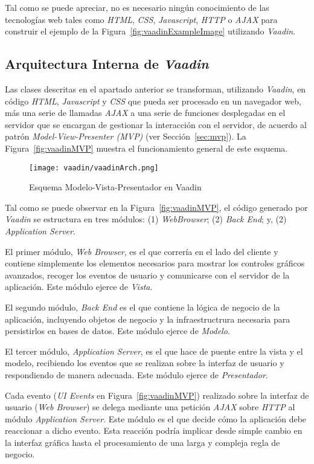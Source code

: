 Tal como se puede apreciar, no es necesario ningún conocimiento de las tecnologías web tales como \emph{HTML}, \emph{CSS}, \emph{Javascript}, \emph{HTTP} o \emph{AJAX} para construir el ejemplo de la Figura~\ref{fig:vaadinExampleImage} utilizando \emph{Vaadin}.

\subsection{Arquitectura Interna de \emph{Vaadin}}

Las clases descritas en el apartado anterior se transforman, utilizando \emph{Vaadin}, en código \emph{HTML}, \emph{Javascript} y \emph{CSS} que pueda ser procesado en un navegador web, más una serie de llamadas \emph{AJAX} a una serie de funciones desplegadas en el servidor que se encargan de gestionar la interacción con el servidor, de acuerdo al patrón \emph{Model-View-Presenter (MVP)} (ver Sección~\ref{sec:mvp}). La Figura~\ref{fig:vaadinMVP} muestra el funcionamiento general de este esquema.

\begin{figure}[!tb]
	\centering
	\texttt{[image: vaadin/vaadinArch.png]}
	\caption{Esquema Modelo-Vista-Presentador en Vaadin}
	\label{fig:fig:vaadinMVP}
\end{figure}

Tal como se puede observar en la Figura~\ref{fig:vaadinMVP}, el código generado por \emph{Vaadin} se estructura en tres módulos: (1) \emph{WebBrowser}; (2) \emph{Back End}; y, (2) \emph{Application Server}.

El primer módulo, \emph{Web Browser}, es el que correría en el lado del cliente y contiene simplemente los elementos necesarios para mostrar los controles gráficos avanzados, recoger los eventos de usuario y comunicarse con el servidor de la aplicación. Este módulo ejerce de \emph{Vista}.

El segundo módulo, \emph{Back End} es el que contiene la lógica de negocio de la aplicación, incluyendo objetos de negocio y la infraestructrura necesaria para persistirlos en bases de datos. Este módulo ejerce de \emph{Modelo}.

El tercer módulo, \emph{Application Server}, es el que hace de puente entre la vista y el modelo, recibiendo los eventos que se realizan sobre la interfaz de usuario y respondiendo de manera adecuada. Este módulo ejerce de \emph{Presentador}.

Cada evento (\emph{UI Events} en Figura~\ref{fig:vaadinMVP}) realizado sobre la interfaz de usuario (\emph{Web Browser}) se delega mediante una petición \emph{AJAX} sobre \emph{HTTP} al módulo \emph{Application Server}. Este módulo es el que decide cómo la aplicación debe reaccionar a dicho evento. Esta reacción podría implicar desde simple cambio en la interfaz gráfica hasta el procesamiento de una larga y compleja regla de negocio. 

